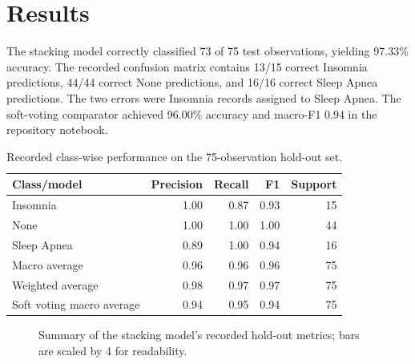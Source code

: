 ﻿\documentclass[preprint,12pt]{elsarticle}
\begin{document}
\section{Results}
The stacking model correctly classified 73 of 75 test observations, yielding 97.33\% accuracy. The recorded confusion matrix contains 13/15 correct Insomnia predictions, 44/44 correct None predictions, and 16/16 correct Sleep Apnea predictions. The two errors were Insomnia records assigned to Sleep Apnea. The soft-voting comparator achieved 96.00\% accuracy and macro-F1 0.94 in the repository notebook.

\begin{table}[t]
\centering
\caption{Recorded class-wise performance on the 75-observation hold-out set.}
\label{tab:metrics}
\small
\begin{tabular}{lrrrr}
\toprule
Class/model & Precision & Recall & F1 & Support \\
\midrule
Insomnia & 1.00 & 0.87 & 0.93 & 15 \\
None & 1.00 & 1.00 & 1.00 & 44 \\
Sleep Apnea & 0.89 & 1.00 & 0.94 & 16 \\
Macro average & 0.96 & 0.96 & 0.96 & 75 \\
Weighted average & 0.98 & 0.97 & 0.97 & 75 \\
\midrule
Soft voting macro average & 0.94 & 0.95 & 0.94 & 75 \\
\bottomrule
\end{tabular}
\end{table}

\begin{figure}[t]
\centering
{}
\caption{Summary of the stacking model's recorded hold-out metrics; bars are scaled by 4 for readability.}
\label{fig:metrics}
\end{figure}
\end{document}
